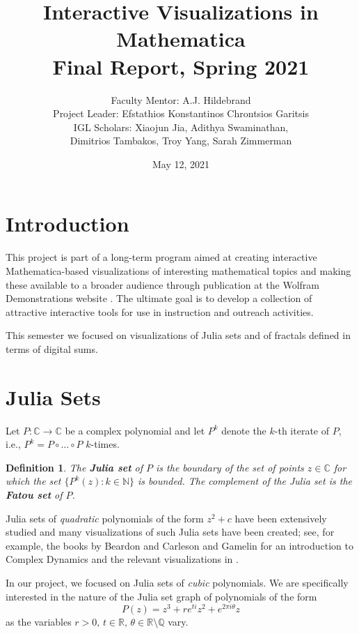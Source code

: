 \documentclass[11pt,leqno]{article}
\newtheorem{defn}{Definition}[section]
\begin{document}
\title{
Interactive Visualizations in Mathematica 
\\
Final Report, Spring 2021}
\author{Faculty Mentor: A.J. Hildebrand \\
    Project Leader: Efstathios Konstantinos Chrontsios Garitsis \\
	IGL Scholars: Xiaojun Jia, Adithya Swaminathan, \\
	Dimitrios Tambakos, Troy Yang, Sarah Zimmerman}
	\date{May 12, 2021}
\maketitle
\section{Introduction}
This project is part of a long-term
program aimed at creating interactive Mathematica-based visualizations of
interesting mathematical topics and making these available to a broader
audience through publication at the Wolfram Demonstrations website \cite{WD}.
The ultimate goal is to develop a collection of attractive
interactive tools for use in instruction and outreach activities. 

This semester we focused on visualizations of Julia sets 
and of fractals defined in terms of digital sums. 


\section{Julia Sets}
Let $P: \mathbb{C} \rightarrow \mathbb{C}$ be a complex polynomial and 
let $P^k$ denote the $k$-th iterate of $P$,
i.e., $P^k = P \circ \dots \circ P$  $k$-times.

\begin{defn}
The \textbf{Julia set} of $P$ is the boundary of the set of points $z \in
\mathbb{C}$ for which the set $\{P^{k}(z) : k \in \mathbb{N}\}$ is
bounded.  The complement of the Julia set is the \textbf{Fatou set} of $P$.
\end{defn}


Julia sets of \emph{quadratic} polynomials of the form ${z^2 + c}$ have
been extensively studied and many visualizations of such Julia sets have
been created; see, for example, the books by Beardon \cite{beardon} and
Carleson and Gamelin \cite{carleson-gamelin} for an introduction to Complex Dynamics and the relevant visualizations in \cite{WD}. 

In our project, we focused on Julia sets of \emph{cubic}
polynomials.  We are specifically interested in the nature of the Julia
set graph of polynomials of the form 
\begin{equation}
\label{eq:polynomial}
P(z)=z^3+re^{ti}z^2+e^{2 \pi i \theta}z
\end{equation}
as the variables $r>0,\, t\in \mathbb{R},\, \theta \in
\mathbb{R}\setminus\mathbb{Q}$ vary. 
\end{document}
